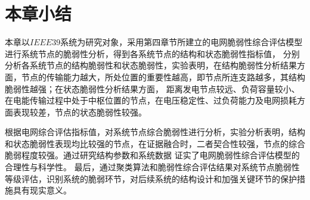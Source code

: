 \section{本章小结}
\label{sec:sum5}

本章以$IEEE39$系统为研究对象，采用第四章节所建立的电网脆弱性综合评估模型进行系统节点的脆弱性分析，得到各系统节点的结构和状态脆弱性指标值，
分别分析各系统节点的结构脆弱性和状态脆弱性，实验表明，在结构脆弱性分析结果方面，节点的传输能力越大，所处位置的重要性越高，即节点所连支路越多，其结构脆弱性越强；在状态脆弱性分析结果方面，
距离发电节点较远、负荷容量较小、在电能传输过程中处于中枢位置的节点，在电压稳定性、过负荷能力及电网损耗方面表现较差，节点的状态脆弱性较强。

根据电网综合评估指标值，对系统节点综合脆弱性进行分析，实验分析表明，结构和状态脆弱性表现均比较强的节点，在证据融合时，二者契合性较强，节点的综合脆弱程度较强。通过研究结构参数和系统数据
证实了电网脆弱性综合评估模型的合理性与科学性。
最后，通过聚类算法和脆弱性综合评估结果对系统节点脆弱性等级评估，识别系统的脆弱环节，对后续系统的结构设计和加强关键环节的保护措施具有现实意义。

